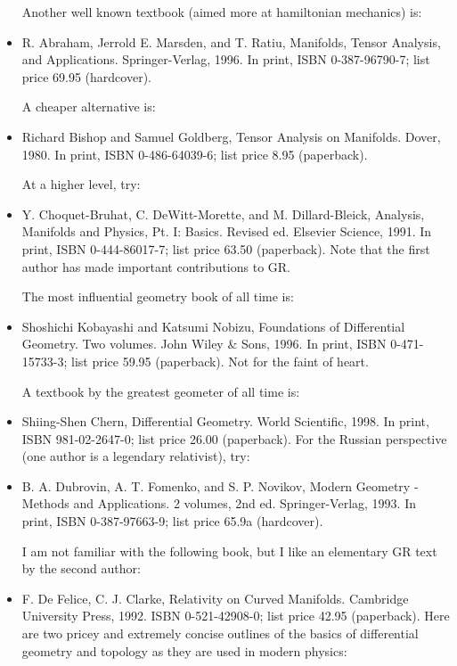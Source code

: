 \documentclass[10pt,a4paper]{book}
\theoremstyle{definition}
\begin{document}
\begin{itemize}
Another well known textbook (aimed more at hamiltonian mechanics) is:

\item R. Abraham, Jerrold E. Marsden, and T. Ratiu,
Manifolds, Tensor Analysis, and Applications.
Springer-Verlag, 1996.
In print, ISBN 0-387-96790-7; list price 69.95 (hardcover).

A cheaper alternative is:

\item Richard Bishop and Samuel Goldberg,
Tensor Analysis on Manifolds.
Dover, 1980.
In print, ISBN 0-486-64039-6; list price 8.95 (paperback).

At a higher level, try:

\item Y. Choquet-Bruhat, C. DeWitt-Morette, and M. Dillard-Bleick,
Analysis, Manifolds and Physics, Pt. I: Basics.  Revised ed.
Elsevier Science, 1991.
In print, ISBN 0-444-86017-7; list price 63.50 (paperback).
Note that the first author has made important contributions to GR.

The most influential geometry book of all time is:

\item Shoshichi Kobayashi and Katsumi Nobizu,
Foundations of Differential Geometry.  Two volumes.
John Wiley \& Sons, 1996.
In print, ISBN 0-471-15733-3; list price 59.95 (paperback).
Not for the faint of heart.

A textbook by the greatest geometer of all time is:

\item Shiing-Shen Chern,
Differential Geometry.
World Scientific, 1998.
In print, ISBN 981-02-2647-0; list price 26.00 (paperback).
For the Russian perspective (one author is a legendary relativist), try:

\item B. A. Dubrovin, A. T. Fomenko, and S. P. Novikov,
Modern Geometry - Methods and Applications.  2 volumes, 2nd ed.
Springer-Verlag, 1993.
In print, ISBN 0-387-97663-9; list price 65.9a (hardcover).

I am not familiar with the following book, but I like an elementary GR text by the second author:

\item F. De Felice, C. J. Clarke,
Relativity on Curved Manifolds.
Cambridge University Press, 1992.
ISBN 0-521-42908-0; list price 42.95 (paperback).
Here are two pricey and extremely concise outlines of the basics of differential geometry and topology as they are used in modern physics:


\end{itemize}
\end{document}
